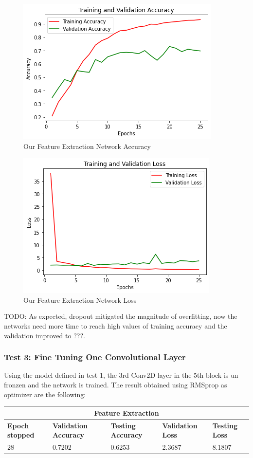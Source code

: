 \medskip

\begin{figure}[H]
	\centering
	\includegraphics[height=0.45\textwidth]{img/vgg16fe2acc.png}
	\caption{Our Feature Extraction Network Accuracy}
	\label{fig:vgg16fe2acc}
\end{figure}

\begin{figure}[H]
	\centering
	\includegraphics[height=0.45\textwidth]{img/vgg16fe2loss.png}
	\caption{Our Feature Extraction Network Loss}
	\label{fig:vgg16fe2oss}
\end{figure}

\noindent TODO: As expected, dropout mitigated the magnitude of overfitting, now the networks need more time to reach high values of training accuracy and the validation improved to ???.



\subsubsection{Test 3: Fine Tuning One Convolutional Layer}
Using the model defined in test 1, the 3rd Conv2D layer in the 5th block is un-fronzen and the network is trained. The result obtained using RMSprop as optimizer are the following:

 
 \medskip

\begin{tabular}{ |p{2cm}|p{2cm}|p{2cm}|p{2cm}|p{2cm}|  }
\hline
\multicolumn{5}{|c|}{Feature Extraction} \\
\hline
\textbf{Epoch stopped} & \textbf{Validation Accuracy} & \textbf{Testing Accuracy} & \textbf{Validation Loss} & \textbf{Testing Loss} \\
\hline
28 & 0.7202 & 0.6253 & 2.3687 & 8.1807\\
\hline
\end{tabular}

